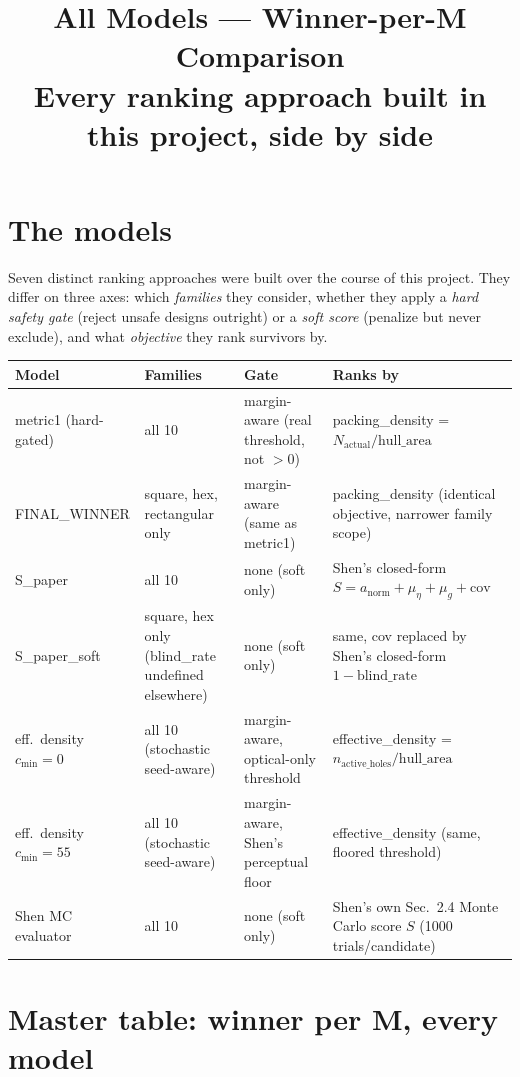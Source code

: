 \documentclass[10pt]{article}
\title{\vspace{-1.5em}All Models — Winner-per-M Comparison\\\large Every ranking approach built in this project, side by side}
\author{}
\date{}
\begin{document}
\maketitle
\vspace{-2em}

\section*{The models}

Seven distinct ranking approaches were built over the course of this project. They differ on
three axes: which \emph{families} they consider, whether they apply a \emph{hard safety gate}
(reject unsafe designs outright) or a \emph{soft score} (penalize but never exclude), and what
\emph{objective} they rank survivors by.

\begin{longtable}{@{}p{3.1cm}p{2.6cm}p{3.5cm}p{6.5cm}@{}}
\toprule
\textbf{Model} & \textbf{Families} & \textbf{Gate} & \textbf{Ranks by} \\
\midrule
\endhead
metric1 (hard-gated) & all 10 & margin-aware (real threshold, not $>0$) & packing\_density = $N_\text{actual}/\text{hull\_area}$ \\
FINAL\_WINNER & square, hex, rectangular only & margin-aware (same as metric1) & packing\_density (identical objective, narrower family scope) \\
S\_paper & all 10 & none (soft only) & Shen's closed-form $S = a_\text{norm}+\mu_\eta+\mu_g+\text{cov}$ \\
S\_paper\_soft & square, hex only (blind\_rate undefined elsewhere) & none (soft only) & same, cov replaced by Shen's closed-form $1-\text{blind\_rate}$ \\
eff.\ density $c_\text{min}{=}0$ & all 10 (stochastic seed-aware) & margin-aware, optical-only threshold & effective\_density = $n_\text{active\_holes}/\text{hull\_area}$ \\
eff.\ density $c_\text{min}{=}55$ & all 10 (stochastic seed-aware) & margin-aware, Shen's perceptual floor & effective\_density (same, floored threshold) \\
Shen MC evaluator & all 10 & none (soft only) & Shen's own Sec.\ 2.4 Monte Carlo score $S$ (1000 trials/candidate) \\
\bottomrule
\end{longtable}

\section*{Master table: winner per M, every model}
\end{document}
